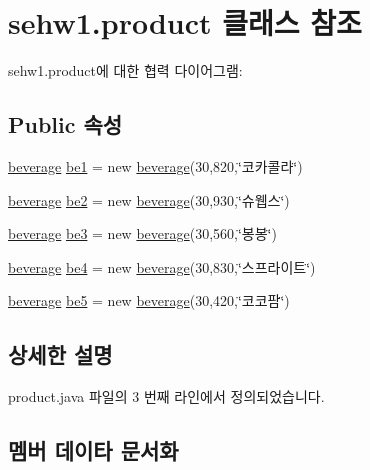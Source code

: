 \hypertarget{classsehw1_1_1product}{}\section{sehw1.\+product 클래스 참조}
\label{classsehw1_1_1product}


sehw1.\+product에 대한 협력 다이어그램\+:
\subsection*{Public 속성}
\begin{DoxyCompactItemize}
\item 
\hyperlink{classsehw1_1_1beverage}{beverage} \hyperlink{classsehw1_1_1product_a78de5ce35a2661747de59366b041bf28}{be1} = new \hyperlink{classsehw1_1_1beverage}{beverage}(30,820,\char`\"{}코카콜라\char`\"{})
\item 
\hyperlink{classsehw1_1_1beverage}{beverage} \hyperlink{classsehw1_1_1product_a970d42cefd2a8aba360fbc62e1dfcd6f}{be2} = new \hyperlink{classsehw1_1_1beverage}{beverage}(30,930,\char`\"{}슈웹스\char`\"{})
\item 
\hyperlink{classsehw1_1_1beverage}{beverage} \hyperlink{classsehw1_1_1product_a15f8a47cd14f9b7fc8faf4fa5836d125}{be3} = new \hyperlink{classsehw1_1_1beverage}{beverage}(30,560,\char`\"{}봉봉\char`\"{})
\item 
\hyperlink{classsehw1_1_1beverage}{beverage} \hyperlink{classsehw1_1_1product_acfca06ee7a734ee15073262cb8fa1c24}{be4} = new \hyperlink{classsehw1_1_1beverage}{beverage}(30,830,\char`\"{}스프라이트\char`\"{})
\item 
\hyperlink{classsehw1_1_1beverage}{beverage} \hyperlink{classsehw1_1_1product_a3818d4dbbdcf52983e2638206c51cc59}{be5} = new \hyperlink{classsehw1_1_1beverage}{beverage}(30,420,\char`\"{}코코팜\char`\"{})
\end{DoxyCompactItemize}


\subsection{상세한 설명}


product.\+java 파일의 3 번째 라인에서 정의되었습니다.



\subsection{멤버 데이타 문서화}
